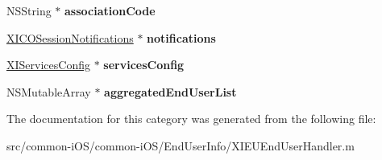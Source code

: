 \begin{DoxyCompactItemize}
N\+S\+String $\ast$ {\bfseries association\+Code}
\item 
\hypertarget{category_x_i_e_u_end_user_handler_07_08_aa56861b4fe6eec45dad966bcccd402d2}{}\label{category_x_i_e_u_end_user_handler_07_08_aa56861b4fe6eec45dad966bcccd402d2} 
\hyperlink{interface_x_i_c_o_session_notifications}{X\+I\+C\+O\+Session\+Notifications} $\ast$ {\bfseries notifications}
\item 
\hypertarget{category_x_i_e_u_end_user_handler_07_08_a6ef2ca0d8ad2d80007af1edaf9c0eabe}{}\label{category_x_i_e_u_end_user_handler_07_08_a6ef2ca0d8ad2d80007af1edaf9c0eabe} 
\hyperlink{interface_x_i_services_config}{X\+I\+Services\+Config} $\ast$ {\bfseries services\+Config}
\item 
\hypertarget{category_x_i_e_u_end_user_handler_07_08_a358d5e21623af89ad06f75fff9581ea8}{}\label{category_x_i_e_u_end_user_handler_07_08_a358d5e21623af89ad06f75fff9581ea8} 
N\+S\+Mutable\+Array $\ast$ {\bfseries aggregated\+End\+User\+List}
\end{DoxyCompactItemize}


The documentation for this category was generated from the following file\+:\begin{DoxyCompactItemize}
\item 
src/common-\/i\+O\+S/common-\/i\+O\+S/\+End\+User\+Info/X\+I\+E\+U\+End\+User\+Handler.\+m\end{DoxyCompactItemize}
